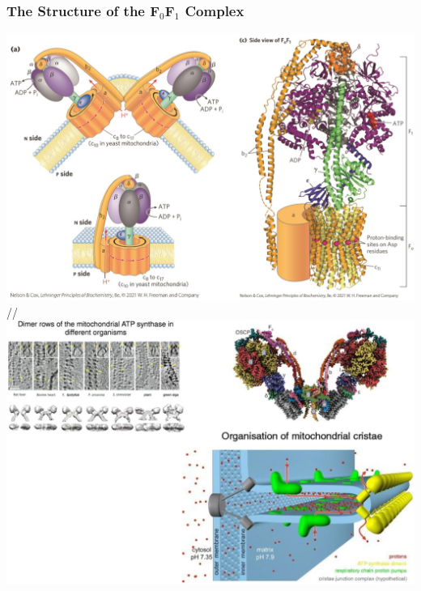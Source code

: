 \documentclass[10pt]{article}
\begin{document}
\subsubsection*{The Structure of the F$_0$F$_1$ Complex}
\begin{center} 
	\includegraphics*[width=\textwidth]{L3_1.png}//
    \includegraphics*[width=\textwidth]{L3_2.png}
\end{center}
\end{document}

